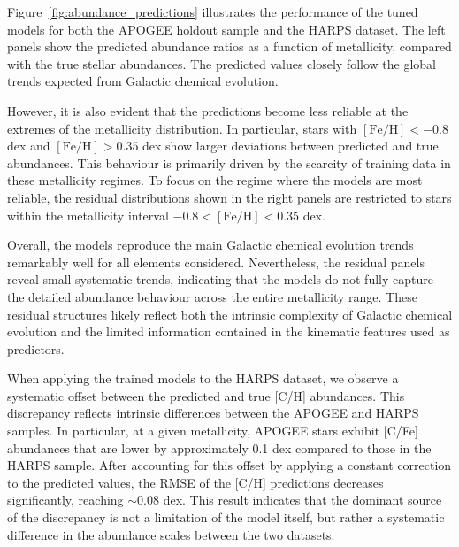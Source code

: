 \documentclass{aa}
\begin{document}
Figure~\ref{fig:abundance_predictions} illustrates the performance of the tuned models for both the APOGEE holdout sample and the HARPS dataset. The left panels show the predicted abundance ratios as a function of metallicity, compared with the true stellar abundances. The predicted values closely follow the global trends expected from Galactic chemical evolution.

However, it is also evident that the predictions become less reliable at the extremes of the metallicity distribution. In particular, stars with $\mathrm{[Fe/H]} < -0.8$ dex and $\mathrm{[Fe/H]} > 0.35$ dex show larger deviations between predicted and true abundances. This behaviour is primarily driven by the scarcity of training data in these metallicity regimes. To focus on the regime where the models are most reliable, the residual distributions shown in the right panels are restricted to stars within the metallicity interval $-0.8 < \mathrm{[Fe/H]} < 0.35$ dex.

Overall, the models reproduce the main Galactic chemical evolution trends remarkably well for all elements considered. Nevertheless, the residual panels reveal small systematic trends, indicating that the models do not fully capture the detailed abundance behaviour across the entire metallicity range. These residual structures likely reflect both the intrinsic complexity of Galactic chemical evolution and the limited information contained in the kinematic features used as predictors.

When applying the trained models to the HARPS dataset, we observe a systematic offset between the predicted and true [C/H] abundances. This discrepancy reflects intrinsic differences between the APOGEE and HARPS samples. In particular, at a given metallicity, APOGEE stars exhibit [C/Fe] abundances that are lower by approximately 0.1 dex compared to those in the HARPS sample. After accounting for this offset by applying a constant correction to the predicted values, the RMSE of the [C/H] predictions decreases significantly, reaching $\sim$0.08 dex. This result indicates that the dominant source of the discrepancy is not a limitation of the model itself, but rather a systematic difference in the abundance scales between the two datasets.
\end{document}
